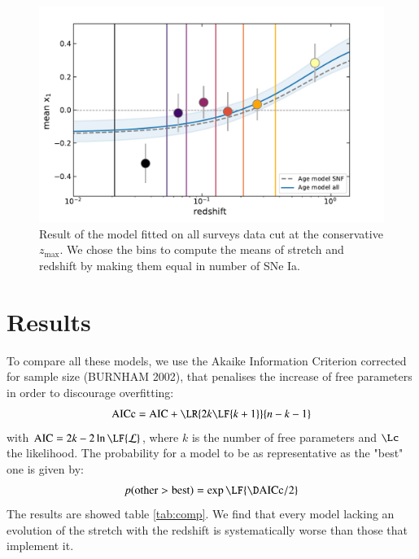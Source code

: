 \documentclass[]{aa} %
\begin{document}
\begin{figure}
    \centering
    \includegraphics[width=\linewidth]{Article_figures/stretchevol_all_vs_snf_maglim_inf.pdf}
    \caption{Result of the model fitted on all surveys data cut at the conservative $z_{\mathrm{max}}$. We chose the bins to compute the means of stretch and redshift by making them equal in number of SNe Ia.}
    \label{fig:model_all}
\end{figure}

\section{Results}
To compare all these models, we use the Akaike Information Criterion corrected
for sample size (BURNHAM 2002), that penalises the increase of free parameters
in order to discourage overfitting:
\begin{equation}
    \mathrm{AICc} = \mathrm{AIC} + \LR{2k\LF{k+1}}{n - k - 1}
\end{equation}
with $\mathrm{AIC} = 2k - 2\ln\LF{\mathcal{L}}$, where $k$ is the number of free
parameters and $\Lc$ the likelihood. The probability for a model to be as
representative as the "best" one is given by:
\begin{equation}
    p(\mathrm{other} > \mathrm{best}) = \exp\LF{\D\mathrm{AICc}/2}
\end{equation}
The results are showed table \ref{tab:comp}. We find that every model lacking an
evolution of the stretch with the redshift is systematically worse than those
that implement it.
\end{document}
